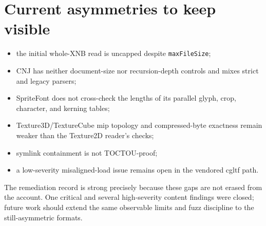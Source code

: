 \section{Current asymmetries to keep visible}

\begin{itemize}
  \item the initial whole-XNB read is uncapped despite \texttt{maxFileSize};
  \item CNJ has neither document-size nor recursion-depth controls and mixes strict and legacy
        parsers;
  \item SpriteFont does not cross-check the lengths of its parallel glyph, crop, character, and
        kerning tables;
  \item Texture3D/TextureCube mip topology and compressed-byte exactness remain weaker than the
        Texture2D reader's checks;
  \item symlink containment is not TOCTOU-proof;
  \item a low-severity misaligned-load issue remains open in the vendored cgltf path.
\end{itemize}

The remediation record is strong precisely because these gaps are not erased from the account.
One critical and several high-severity content findings were closed; future work should extend
the same observable limits and fuzz discipline to the still-asymmetric formats.
